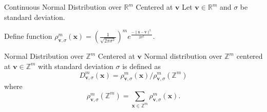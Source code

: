 \begin{frame}{Continuous Normal Distribution over $\mathbb{R}^m$ Centered at $\mathbf{v}$}
	Let $\mathbf{v} \in \mathbb{R}^m$ and $\sigma$ be standard deviation.
	
	Define function $\rho^m_{\mathbf{v}, \sigma}(\mathbf{x}) = \left(\frac{1}{\sqrt{2\pi \sigma^2}}\right)^m e^{\frac{-\lVert\mathbf{x}-\mathbf{v}\rVert^2}{2\sigma^2}}$.
\end{frame}
\begin{frame}{Normal Distribution over $\mathbb{Z}^m$ Centered at $\mathbf{v}$}
	Normal distribution over $\mathbb{Z}^m$ centered at $\mathbf{v} \in \mathbb{Z}^m$ with standard deviation $\sigma$ is defined as 
	\begin{equation*}
		D^m_{\mathbf{v}, \sigma}(\mathbf{x}) = \rho^m_{\mathbf{v}, \sigma}(\mathbf{x}) / \rho^m_{\mathbf{v}, \sigma}(\mathbb{Z}^m)
	\end{equation*}
	where 
	\begin{equation*}
		\rho^m_{\mathbf{v}, \sigma}(\mathbb{Z}^m) = \sum_{\mathbf{x} \in \mathbb{Z}^m}\rho^m_{\mathbf{v}, \sigma}(\mathbf{x}).
	\end{equation*}
\end{frame}